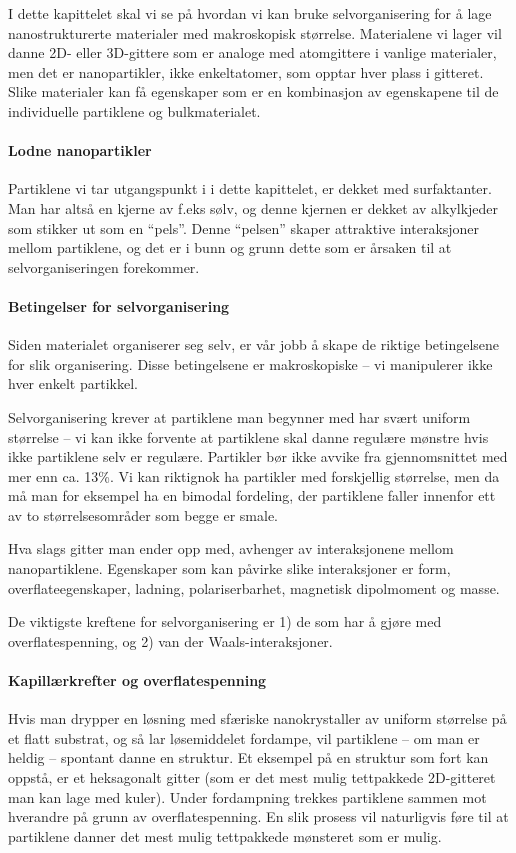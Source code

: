 I dette kapittelet skal vi se på hvordan vi kan bruke selvorganisering for å lage nanostrukturerte materialer med makroskopisk størrelse.  Materialene vi lager vil danne 2D- eller 3D-gittere som er analoge med atomgittere i vanlige materialer, men det er nanopartikler, ikke enkeltatomer, som opptar hver plass i gitteret. Slike materialer kan få egenskaper som er en kombinasjon av egenskapene til de individuelle partiklene og bulkmaterialet.

\paragraph{Lodne nanopartikler} Partiklene vi tar utgangspunkt i i dette kapittelet, er dekket med surfaktanter. Man har altså en kjerne av f.eks sølv, og denne kjernen er dekket av alkylkjeder som stikker ut som en ``pels''. Denne ``pelsen'' skaper attraktive interaksjoner mellom partiklene, og det er i bunn og grunn dette som er årsaken til at selvorganiseringen forekommer.

\paragraph{Betingelser for selvorganisering} Siden materialet organiserer seg selv, er vår jobb å skape de riktige betingelsene for slik organisering. Disse betingelsene er makroskopiske -- vi manipulerer ikke hver enkelt partikkel.

Selvorganisering krever at partiklene man begynner med har svært uniform størrelse -- vi kan ikke forvente at partiklene skal danne regulære mønstre hvis ikke partiklene selv er regulære. Partikler bør ikke avvike fra gjennomsnittet med mer enn ca. 13\%. Vi kan riktignok ha partikler med forskjellig størrelse, men da må man for eksempel ha en bimodal fordeling, der partiklene faller innenfor ett av to størrelsesområder som begge er smale.

Hva slags gitter man ender opp med, avhenger av interaksjonene mellom nanopartiklene. Egenskaper som kan påvirke slike interaksjoner er form, overflateegenskaper, ladning, polariserbarhet, magnetisk dipolmoment og masse.

De viktigste kreftene for selvorganisering er 1) de som har å gjøre med overflatespenning, og 2) van der Waals-interaksjoner.

\paragraph{Kapillærkrefter og overflatespenning}Hvis man drypper en løsning med sfæriske nanokrystaller av uniform størrelse på et flatt substrat, og så lar løsemiddelet fordampe, vil partiklene -- om man er heldig -- spontant danne en struktur. Et eksempel på en struktur som fort kan oppstå, er et heksagonalt gitter (som er det mest mulig tettpakkede 2D-gitteret man kan lage med kuler). Under fordampning trekkes partiklene sammen mot hverandre på grunn av overflatespenning. En slik prosess vil naturligvis føre til at partiklene danner det mest mulig tettpakkede mønsteret som er mulig.

